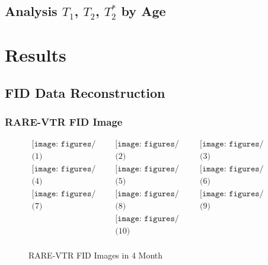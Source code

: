 \documentclass[10pt, a4paper]{article}
\begin{document}
		\subsection{Analysis $T_1$, $T_2$, $T_2^*$  by Age}
	
	\section{Results}
		\subsection{FID Data Reconstruction}
			\subsubsection{RARE-VTR FID Image}
				
				\begin{figure}[htbp]
					\centering
					$\begin{array}{ccc}
						\texttt{[image: figures/VTR\_4month/VTR\_1.png]}
						&
						\texttt{[image: figures/VTR\_4month/VTR\_2.png]}
						&
						\texttt{[image: figures/VTR\_4month/VTR\_3.png]}
						\\
						\mbox{(1)} & \mbox{(2)} & \mbox{(3)} \\
						
						\texttt{[image: figures/VTR\_4month/VTR\_4.png]}
						&
						\texttt{[image: figures/VTR\_4month/VTR\_5.png]}
						&
						\texttt{[image: figures/VTR\_4month/VTR\_6.png]}
						\\
						\mbox{(4)} & \mbox{(5)} & \mbox{(6)} \\
						
						\texttt{[image: figures/VTR\_4month/VTR\_7.png]}
						&
						\texttt{[image: figures/VTR\_4month/VTR\_8.png]}
						&
						\texttt{[image: figures/VTR\_4month/VTR\_9.png]}
						\\
						\mbox{(7)} & \mbox{(8)} & \mbox{(9)} \\
						
						&
						\texttt{[image: figures/VTR\_4month/VTR\_10.png]}
						&
						\\
						& \mbox{(10)} & \\
					\end{array}$
					\caption{RARE-VTR FID Images in 4 Month}
					\label{fig:vtr_4month_image}
				\end{figure}
		
\end{document}
